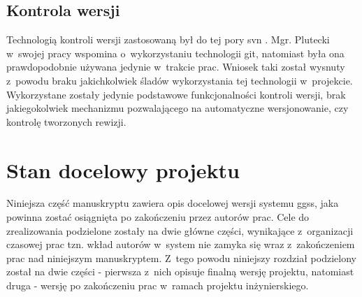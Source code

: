 \newpage

\subsection{Kontrola wersji}

Technologią kontroli wersji zastosowaną był do tej pory \gls*{svn} \cite{SVNMain}. Mgr. Plutecki w~swojej pracy wspomina o~wykorzystaniu technologii \gls*{git}, natomiast była ona prawdopodobnie używana jedynie w~trakcie prac. Wniosek taki został wysnuty z~powodu braku jakichkolwiek śladów wykorzystania tej technologii w~projekcie. Wykorzystane zostały jedynie podstawowe funkcjonalności kontroli wersji, brak jakiegokolwiek mechanizmu pozwalającego na automatyczne wersjonowanie, czy kontrolę tworzonych rewizji.



\section{Stan docelowy projektu}
\label{cha:docel}
Niniejsza część manuskryptu zawiera opis docelowej wersji systemu \gls*{ggss}, jaka powinna zostać osiągnięta po zakończeniu przez autorów prac. Cele do zrealizowania podzielone zostały na dwie główne części, wynikające z~organizacji czasowej prac tzn. wkład autorów w~system nie zamyka się wraz z~zakończeniem prac nad niniejszym manuskryptem. Z~tego powodu niniejszy rozdział podzielony został na dwie części - pierwsza z~nich opisuje finalną wersję projektu, natomiast druga - wersję po zakończeniu prac w~ramach projektu inżynierskiego.

